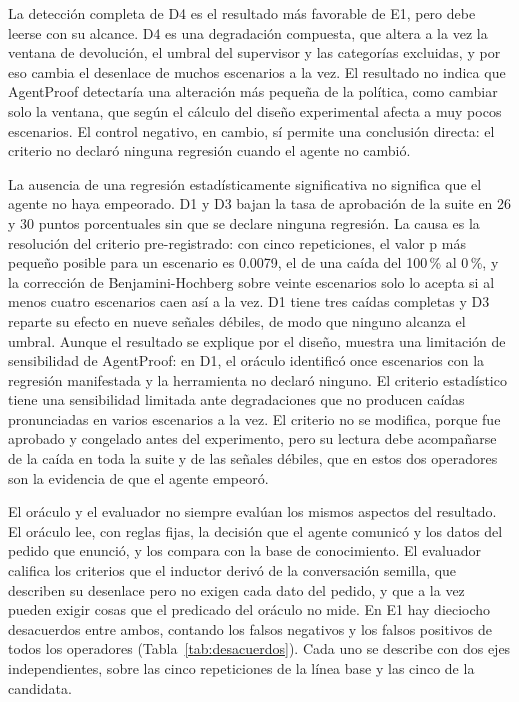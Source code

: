 La detección completa de D4 es el resultado más favorable de E1, pero debe leerse con su alcance. D4 es una degradación compuesta, que altera a la vez la ventana de devolución, el umbral del supervisor y las categorías excluidas, y por eso cambia el desenlace de muchos escenarios a la vez. El resultado no indica que AgentProof detectaría una alteración más pequeña de la política, como cambiar solo la ventana, que según el cálculo del diseño experimental afecta a muy pocos escenarios. El control negativo, en cambio, sí permite una conclusión directa: el criterio no declaró ninguna regresión cuando el agente no cambió.
\par
La ausencia de una regresión estadísticamente significativa no significa que el agente no haya empeorado. D1 y D3 bajan la tasa de aprobación de la suite en 26 y 30 puntos porcentuales sin que se declare ninguna regresión. La causa es la resolución del criterio pre-registrado: con cinco repeticiones, el valor p más pequeño posible para un escenario es 0.0079, el de una caída del 100\,\% al 0\,\%, y la corrección de Benjamini-Hochberg sobre veinte escenarios solo lo acepta si al menos cuatro escenarios caen así a la vez. D1 tiene tres caídas completas y D3 reparte su efecto en nueve señales débiles, de modo que ninguno alcanza el umbral. Aunque el resultado se explique por el diseño, muestra una limitación de sensibilidad de AgentProof: en D1, el oráculo identificó once escenarios con la regresión manifestada y la herramienta no declaró ninguno. El criterio estadístico tiene una sensibilidad limitada ante degradaciones que no producen caídas pronunciadas en varios escenarios a la vez. El criterio no se modifica, porque fue aprobado y congelado antes del experimento, pero su lectura debe acompañarse de la caída en toda la suite y de las señales débiles, que en estos dos operadores son la evidencia de que el agente empeoró.
\par
El oráculo y el evaluador no siempre evalúan los mismos aspectos del resultado. El oráculo lee, con reglas fijas, la decisión que el agente comunicó y los datos del pedido que enunció, y los compara con la base de conocimiento. El evaluador califica los criterios que el inductor derivó de la conversación semilla, que describen su desenlace pero no exigen cada dato del pedido, y que a la vez pueden exigir cosas que el predicado del oráculo no mide. En E1 hay dieciocho desacuerdos entre ambos, contando los falsos negativos y los falsos positivos de todos los operadores (Tabla~\ref{tab:desacuerdos}). Cada uno se describe con dos ejes independientes, sobre las cinco repeticiones de la línea base y las cinco de la candidata.
